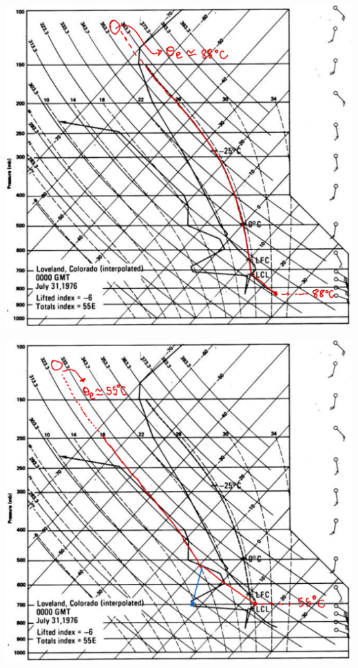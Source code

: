 \documentclass[../main.tex]{subfiles}
\begin{document}
\begin{enumerate}[a)]
\begin{minipage}{0.5\linewidth}
    \centering
      \includegraphics[width=\textwidth]{img/oe1}
\end{minipage}
\begin{minipage}{0.5\linewidth}
    \centering
      \includegraphics[width=\textwidth]{img/oe2}
\end{minipage}\\



\end{enumerate}
\end{document}
